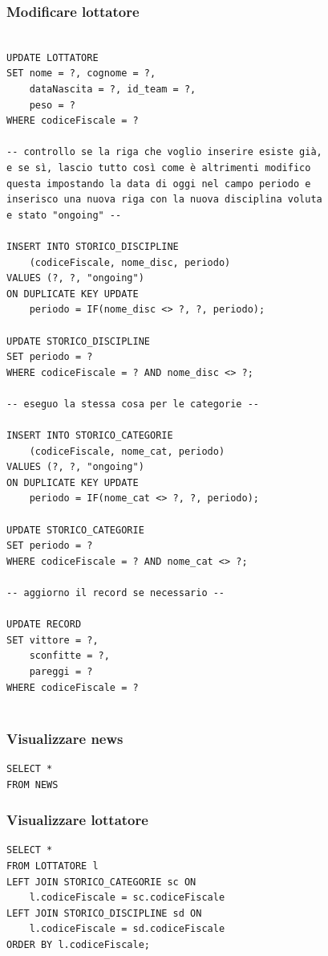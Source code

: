 \documentclass[a4paper,12pt]{report}
\begin{document}
\subsubsection{Modificare lottatore}
\begin{verbatim}

UPDATE LOTTATORE 
SET nome = ?, cognome = ?,
    dataNascita = ?, id_team = ?, 
    peso = ?
WHERE codiceFiscale = ?

-- controllo se la riga che voglio inserire esiste già, 
e se sì, lascio tutto così come è altrimenti modifico 
questa impostando la data di oggi nel campo periodo e 
inserisco una nuova riga con la nuova disciplina voluta 
e stato "ongoing" --

INSERT INTO STORICO_DISCIPLINE 
    (codiceFiscale, nome_disc, periodo)
VALUES (?, ?, "ongoing")
ON DUPLICATE KEY UPDATE
    periodo = IF(nome_disc <> ?, ?, periodo);

UPDATE STORICO_DISCIPLINE
SET periodo = ?
WHERE codiceFiscale = ? AND nome_disc <> ?;

-- eseguo la stessa cosa per le categorie --

INSERT INTO STORICO_CATEGORIE   
    (codiceFiscale, nome_cat, periodo)
VALUES (?, ?, "ongoing")
ON DUPLICATE KEY UPDATE
    periodo = IF(nome_cat <> ?, ?, periodo);

UPDATE STORICO_CATEGORIE
SET periodo = ?
WHERE codiceFiscale = ? AND nome_cat <> ?;

-- aggiorno il record se necessario --

UPDATE RECORD 
SET vittore = ?,
    sconfitte = ?,
    pareggi = ?
WHERE codiceFiscale = ?
    
\end{verbatim}
\subsubsection{Visualizzare news}
\begin{verbatim}
SELECT *
FROM NEWS
\end{verbatim}
\subsubsection{Visualizzare lottatore}
\begin{verbatim}
SELECT *
FROM LOTTATORE l
LEFT JOIN STORICO_CATEGORIE sc ON 
    l.codiceFiscale = sc.codiceFiscale
LEFT JOIN STORICO_DISCIPLINE sd ON 
    l.codiceFiscale = sd.codiceFiscale
ORDER BY l.codiceFiscale;    
\end{verbatim}
\end{document}
